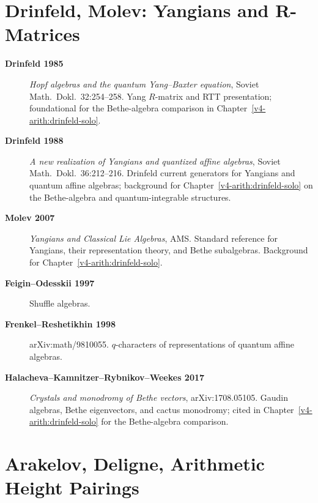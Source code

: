 \section{Drinfeld, Molev: Yangians and R-Matrices}
\label{v4-arith:app:A:yangians}

\begin{description}
\item[\textbf{Drinfeld 1985}] \emph{Hopf algebras and the quantum
Yang--Baxter equation}, Soviet Math.~Dokl.~32:254--258.
Yang \(R\)-matrix and RTT presentation; foundational for the
Bethe-algebra comparison in Chapter~\ref{v4-arith:drinfeld-solo}.
\item[\textbf{Drinfeld 1988}] \emph{A new realization of Yangians
and quantized affine algebras}, Soviet Math.~Dokl.~36:212--216.
Drinfeld current generators for Yangians and quantum affine algebras;
background for Chapter~\ref{v4-arith:drinfeld-solo} on the Bethe-algebra
and quantum-integrable structures.
\item[\textbf{Molev 2007}] \emph{Yangians and Classical Lie
Algebras}, AMS. Standard reference for Yangians, their
representation theory, and Bethe subalgebras. Background for
Chapter~\ref{v4-arith:drinfeld-solo}.
\item[\textbf{Feigin--Odesskii 1997}]
Shuffle algebras.
\item[\textbf{Frenkel--Reshetikhin 1998}] arXiv:math/9810055.
\(q\)-characters of representations of quantum affine algebras.
\item[\textbf{Halacheva--Kamnitzer--Rybnikov--Weekes 2017}] 
\emph{Crystals and monodromy of Bethe vectors}, arXiv:1708.05105.
Gaudin algebras, Bethe eigenvectors, and cactus monodromy; cited in
Chapter~\ref{v4-arith:drinfeld-solo} for the Bethe-algebra comparison.
\end{description}

\section{Arakelov, Deligne, Arithmetic Height Pairings}
\label{v4-arith:app:A:arakelov}

